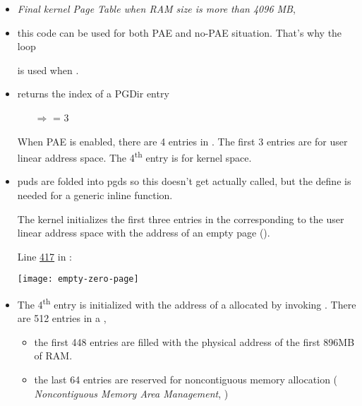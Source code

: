 \begin{itemize}
\item \emph{Final kernel Page Table when RAM size is more than 4096 MB},
  \cite[Sec 2.5.5.4]{bovet2005understanding}
\item this code can be used for both PAE and no-PAE situation. That's why the 
  loop
  \begin{center}
  \end{center}
  is used when .
\item {} returns the index of a PGDir entry
  \begin{center}
  \end{center}
  \begin{itemize}
  \item[$\Rightarrow$]  = 3
  \end{itemize}
  When PAE is enabled, there are 4 entries in . The first 3 entries are for
  user linear address space. The 4\textsuperscript{th} entry is for kernel space.
\item {}
  puds are folded into pgds so this doesn't get actually called, but the define is needed
  for a generic inline function.
  \begin{center}
  \end{center}
  The kernel initializes the first three entries in the  corresponding to the
  user linear address space with the address of an empty page ().

  Line \href{http://lxr.linux.no/linux+v2.6.11/arch/i386/kernel/head.S#L417}{417} in
  :
  \begin{center}
    \texttt{[image: empty-zero-page]}
  \end{center}
\item The 4\textsuperscript{th} entry is initialized with the address of a 
  allocated by invoking . There are 512
  entries in a ,
  \begin{itemize}
  \item the first 448 entries are filled with the physical address of the first 896MB
    of RAM.
  \item the last 64 entries are reserved for noncontiguous memory allocation (
    \emph{Noncontiguous Memory Area Management}, \cite[Sec 8.3]{bovet2005understanding})
  \end{itemize}
\end{itemize}

